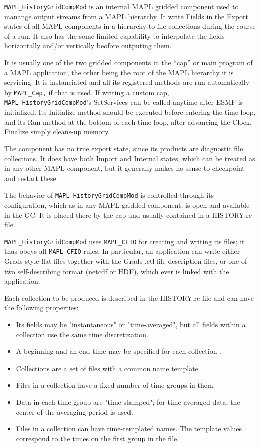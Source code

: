 %
%

{\tt MAPL\_HistoryGridCompMod} is an internal MAPL gridded component
used to manange output streams from a MAPL hierarchy. It write Fields
in the Export states of all MAPL components in a hierarchy to file
collections during the course of a run. It also has the some limited
capability to interpolate the fields horizontally and/or vertically
beofore outputing them.

It is usually one of the two gridded components in the ``cap'' or main
program of a MAPL application, the other being the root of the MAPL
hierarchy it is servicing. It is instanciated and all its registered
methods are run automatically by {\tt MAPL\_Cap,} if that is used.  If
writing a custom cap, {\tt MAPL\_HistoryGridCompMod}'s SetServices can
be called anytime after ESMF is initialized.  Its Initialize method
should be executed before entering the time loop, and its Run method
at the bottom of each time loop, after advancing the Clock. Finalize
simply cleans-up memory.

The component has no true export state, since its products are
diagnostic file collections. It does have both Import and Internal
states, which can be treated as in any other MAPL component, but it
generally makes no sense to checkpoint and restart these.

The behavior of {\tt MAPL\_HistoryGridCompMod} is controlled through
its configuration, which as in any MAPL gridded component, is open and
available in the GC. It is placed there by the cap and usually
contained in a HISTORY.rc file.

{\tt MAPL\_HistoryGridCompMod} uses {\tt MAPL\_CFIO} for creating and
writing its files; it thus obeys all {\tt MAPL\_CFIO} rules. In
particular, an application can write either Grads style flat files
together with the Grads .ctl file description files, or one of two
self-describing format (netcdf or HDF), which ever is linked with the
application.

Each collection to be produced is described in the HISTORY.rc file and
can have the following properties:
\begin{itemize}
\item Its fields may be "instantaneous" or "time-averaged", but all fields within
      a collection use the same time discretization. 
\item A beginning and an end time may be specified for each collection .
\item Collections are a set of files with a common name template. 
\item Files in a collection have a fixed number of time groups in them.
\item Data in each time group are "time-stamped"; for time-averaged data,
 the center of the averaging period is used.
\item Files in a collection can have time-templated names. The template
      values correspond to the times on the first group in the file.
\end{itemize}

